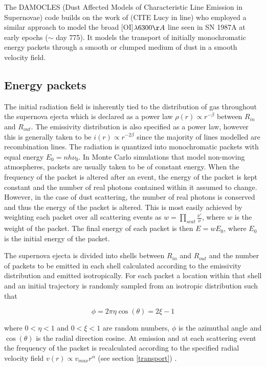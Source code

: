 \documentclass[useAMS,usenatbib]{mn2e}
\begin{document}
The DAMOCLES (Dust Affected Models of Characteristic Line Emission in Supernovae) code builds on the work of (CITE Lucy in line) who employed a similar approach to model the broad [OI]$\lambda 6300\AA$ line seen in SN 1987A at early epochs ($\sim$ day 775).  It models the transport of initially monochromatic energy packets through a smooth or clumped medium of dust in a smooth velocity field.


\subsection{Energy packets}
\label{packets}
The initial radiation field is inherently tied to the distribution of gas throughout the supernova ejecta which is declared as a  power law  $\rho(r) \propto r^{-\beta}$ between $R_{in}$ and $R_{out}$. The emissivity distribution is also specified as a power law, however this is generally taken to be $i(r) \propto r ^{-2\beta}$ since the majority of lines modelled are recombination lines.  The radiation is quantized into monochromatic packets with equal energy $E_{0}=nh\nu_{0}$.  In Monte Carlo simulations that model non-moving atmospheres, packets are usually taken to be of constant energy.  When the frequency of the packet is altered after an event, the energy of the packet is kept constant and the number of real photons contained within it assumed to change.  However, in the case of dust scattering, the number of real photons is conserved and thus the energy of the packet is altered.  This is most easily achieved by weighting each packet over all scattering events as $w=\prod_{scat} \frac{\nu'}{\nu}$, where $w$ is the weight of the packet.  The final energy of each packet is then $E=wE_0$, where $E_0$ is the initial energy of the packet.

The supernova ejecta is divided into shells between $R_{in}$ and $R_{out}$ and the number of packets to be emitted in each shell calculated according to the emissivity distribution and emitted isotropically.  For each packet a location within that shell and an initial trajectory is randomly sampled from an isotropic distribution such that 

\begin{equation}
\phi=2\pi\eta
 \cos (\theta)=2\xi -1
\end{equation}

\noindent where $0<\eta<1$ and $0<\xi<1$ are random numbers, $\phi$ is the azimuthal angle and $\cos (\theta)$ is the radial direction cosine.  At emission and at each scattering event the frequency of the packet is recalculated according to the specified radial velocity field $v(r) \propto v_{max}r^{\alpha}$ (see section \ref{transport}) .
\end{document}
